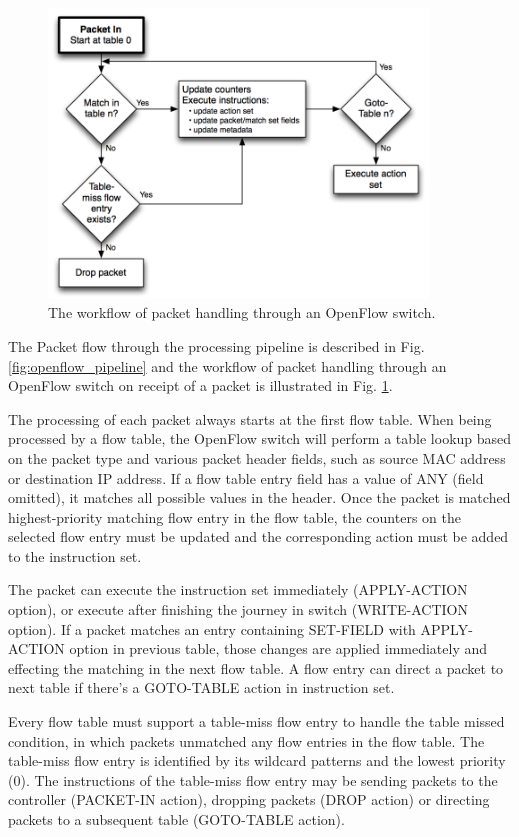 \begin{figure}[!t]
\centering
\includegraphics[width=0.9\textwidth]{./fig/openflow_matching}
\caption{The workflow of packet handling through an OpenFlow switch. \cite{openflow-spec}}
\label{fig:openflow_matching}
\end{figure}

The Packet flow through the processing pipeline is described in Fig. \ref{fig:openflow_pipeline} and the workflow of packet handling through an OpenFlow switch on receipt of a packet is illustrated in Fig. \ref{fig:openflow_matching}.

The processing of each packet always starts at the first flow table.
When being processed by a flow table, the OpenFlow switch will perform a table lookup based on the packet type and various packet header fields, such as source MAC address or destination IP address.
If a flow table entry field has a value of ANY (field omitted), it matches all possible values in the header.
Once the packet is matched highest-priority matching flow entry in the flow table, the counters on the selected flow entry must be updated and the corresponding action must be added to the instruction set.

The packet can execute the instruction set immediately (APPLY-ACTION option), or execute after finishing the journey in switch (WRITE-ACTION option).
If a packet matches an entry containing SET-FIELD with APPLY-ACTION option in previous table, those changes are applied immediately and effecting the matching in the next flow table.
A flow entry can direct a packet to next table if there's a GOTO-TABLE action in instruction set.

Every flow table must support a table-miss flow entry to handle the table missed condition, in which packets unmatched any flow entries in the flow table. The table-miss flow entry is identified by its wildcard patterns and the lowest priority (0). The instructions of the table-miss flow entry may be sending packets to the controller (PACKET-IN action), dropping packets (DROP action) or directing packets to a subsequent table (GOTO-TABLE action).




